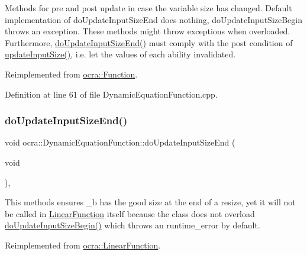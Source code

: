 Methods for pre and post update in case the variable size has changed. Default implementation of do\+Update\+Input\+Size\+End does nothing, do\+Update\+Input\+Size\+Begin throws an exception. These methods might throw exceptions when overloaded. Furthermore, {\ttfamily \hyperlink{classocra_1_1DynamicEquationFunction_a8d20f6ed1e3983d1fddf648729eba955}{do\+Update\+Input\+Size\+End()}} must comply with the post condition of {\ttfamily \hyperlink{classocra_1_1Function_a3a5b9e6ae296339acc87ab2cbf97ef98}{update\+Input\+Size()}}, i.\+e. let the values of each ability invalidated. 

Reimplemented from \hyperlink{classocra_1_1Function_a3f728f3758e6448aa59932853db5ddcc}{ocra\+::\+Function}.



Definition at line 61 of file Dynamic\+Equation\+Function.\+cpp.

\hypertarget{classocra_1_1DynamicEquationFunction_a8d20f6ed1e3983d1fddf648729eba955}{}\label{classocra_1_1DynamicEquationFunction_a8d20f6ed1e3983d1fddf648729eba955} 
\subsubsection{\texorpdfstring{do\+Update\+Input\+Size\+End()}{doUpdateInputSizeEnd()}}
{\footnotesize\ttfamily void ocra\+::\+Dynamic\+Equation\+Function\+::do\+Update\+Input\+Size\+End (\begin{DoxyParamCaption}\item[{void}]{ }\end{DoxyParamCaption})\hspace{0.3cm}{\ttfamily [protected]}, {\ttfamily [virtual]}}

This methods ensures \+\_\+b has the good size at the end of a resize, yet it will not be called in \hyperlink{classocra_1_1LinearFunction}{Linear\+Function} itself because the class does not overload \hyperlink{classocra_1_1DynamicEquationFunction_a6fc52fcd947fa303e55729dbb286b92c}{do\+Update\+Input\+Size\+Begin()} which throws an runtime\+\_\+error by default. 

Reimplemented from \hyperlink{classocra_1_1LinearFunction_ac6bdf62ad6634397778d5f4223ed6d82}{ocra\+::\+Linear\+Function}.



